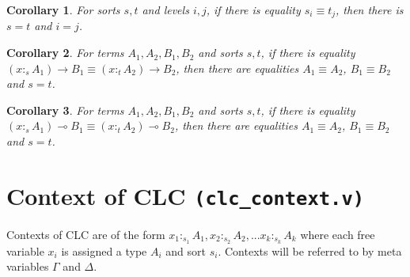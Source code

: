 \documentclass{article}
\newtheorem{corollary}{Corollary}[theorem]
\theoremstyle{definition}
\newcommand{\stype}[1]{:_{#1}}
\begin{document}
\begin{corollary}\label{sortinj}
  For sorts $s, t$ and levels $i, j$, if there is equality $s_i \equiv t_j$, then there is $s = t$ and $i = j$.
\end{corollary}

\begin{corollary}\label{arrowinj}
  For terms $A_1, A_2, B_1, B_2$ and sorts $s, t$, if there is equality $(x \stype{s} A_1) \rightarrow B_1 \equiv (x \stype{t} A_2) \rightarrow B_2$, then there are equalities $A_1 \equiv A_2$, $B_1 \equiv B_2$ and $s = t$.
\end{corollary}

\begin{corollary}\label{lolliinj}
  For terms $A_1, A_2, B_1, B_2$ and sorts $s, t$, if there is equality $(x \stype{s} A_1) \multimap B_1 \equiv (x \stype{t} A_2) \multimap B_2$, then there are equalities $A_1 \equiv A_2$, $B_1 \equiv B_2$ and $s = t$.
\end{corollary}

\section{Context of CLC \texttt{(clc_context.v)}}
Contexts of CLC are of the form $x_1 \stype{s_1} A_1, x_2 \stype{s_2} A_2, ... x_k \stype{s_k} A_k$ where each free variable $x_i$ is assigned a type $A_i$ and sort $s_i$. Contexts will be referred to by meta variables $\Gamma$ and $\Delta$.
\end{document}
